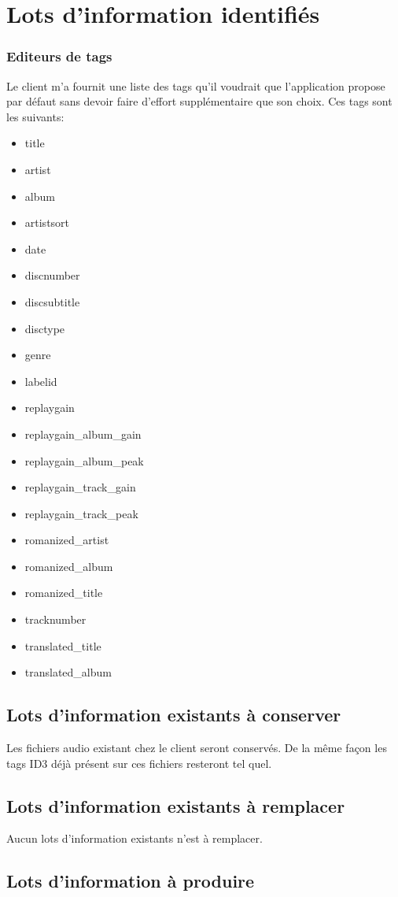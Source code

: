 \documentclass[a4paper,12pt]{report}
\begin{document}
\section{Lots d'information identifiés}

\subsubsection{Editeurs de tags}

Le client m'a fournit une liste des tags qu'il voudrait que l'application propose par défaut sans devoir faire d'effort supplémentaire que son choix.
Ces tags sont les suivants:

\begin{itemize}
	\item title
	\item artist
	\item album
	\item artistsort
	\item date
	\item discnumber
	\item discsubtitle
	\item disctype
	\item genre
	\item labelid
	\item replaygain
	\item replaygain\_album\_gain
	\item replaygain\_album\_peak
	\item replaygain\_track\_gain
	\item replaygain\_track\_peak
	\item romanized\_artist
	\item romanized\_album
	\item romanized\_title
	\item tracknumber
	\item translated\_title
	\item translated\_album
\end{itemize}

\subsection{Lots d'information existants à conserver}

Les fichiers audio existant chez le client seront conservés. De la même façon les tags ID3 déjà présent sur ces fichiers resteront tel quel. 

\subsection{Lots d'information existants à remplacer}

Aucun lots d'information existants n'est à remplacer.

\subsection{Lots d'information à produire}
 
\end{document}
